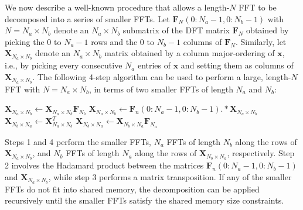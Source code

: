 \documentclass{gtac}
\theoremstyle{problemstyle}
\begin{document}
We now describe a well-known procedure that allows a length-$N$ FFT to be decomposed into a series of smaller FFTs. Let $\mathbf{F}_N (0 \colon N_a-1, 0 \colon N_b-1)$ with $N = N_a \times N_b$ denote an $N_a \times N_b$ submatrix of the DFT matrix $\mathbf{F}_N$ obtained by picking the $0$ to $N_a-1$ rows and the $0$ to $N_b-1$ columns of $\mathbf{F}_N$. Similarly, let $\mathbf{X}_{N_a \times N_b}$ denote an $N_a \times N_b$ matrix obtained by a column major-ordering of $\mathbf{x}$, i.e., by picking every consecutive $N_a$ entries of $\mathbf{x}$ and setting them as columns of $\mathbf{X}_{N_a \times N_b}$. The following 4-step algorithm can be used to perform a large, length-$N$ FFT with $N = N_a \times N_b$, in terms of two smaller FFTs of length $N_a$ and $N_b$:
\begin{algorithm}
\begin{algorithmic}[1]
\State $\mathbf{X}_{N_a \times N_b} \gets \mathbf{X}_{N_a \times N_b} \mathbf{F}_{N_b}$ 
\State $\mathbf{X}_{N_a \times N_b} \gets \mathbf{F}_n (0 \colon N_a-1, 0 \colon N_b-1) .* \mathbf{X}_{N_a \times N_b}$ 
\State $\mathbf{X}_{N_b \times N_a} \gets \mathbf{X}_{N_a \times N_b}^{T}$
\State $\mathbf{X}_{N_b \times N_a} \gets \mathbf{X}_{N_b \times N_a} \mathbf{F}_{N_a}$ 
\end{algorithmic}
\caption{4-Step FFT Algorithm \cite{bailey89}}
\label{alg:4_step_fft}
\end{algorithm}

Steps 1 and 4 perform the smaller FFTs, $N_a$ FFTs of length $N_b$ along the rows of $\mathbf{X}_{N_a \times N_b}$, and $N_b$ FFTs of length $N_a$ along the rows of $\mathbf{X}_{N_b \times N_a}$, respectively. Step 2 involves the Hadamard product between the matrices $\mathbf{F}_n (0 \colon N_a-1, 0 \colon N_b-1)$ and $\mathbf{X}_{N_a \times N_b}$, while step 3 performs a matrix transposition. If any of the smaller FFTs do not fit into shared memory, the decomposition can be applied recursively until the smaller FFTs satisfy the shared memory size constraints.
\end{document}
